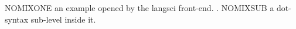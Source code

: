 

\ea NOMIXONE an example opened by the langsci front-end.
\a. NOMIXSUB a dot-syntax sub-level inside it.
\z

